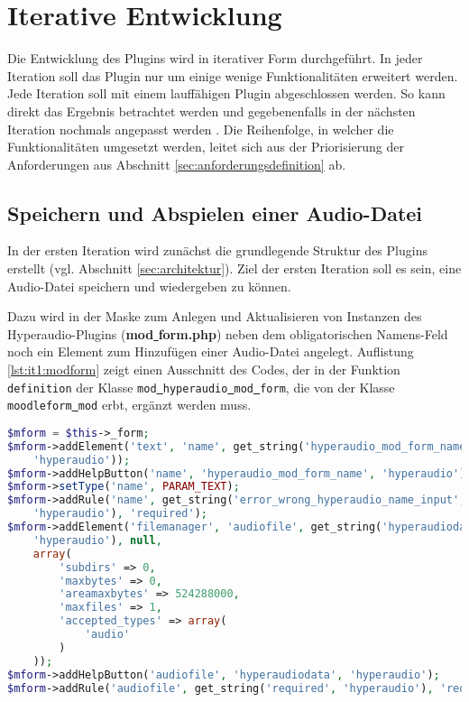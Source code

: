 \section{Iterative Entwicklung}
Die Entwicklung des Plugins wird in iterativer Form durchgeführt. In jeder Iteration soll das Plugin nur um einige wenige Funktionalitäten erweitert werden. Jede Iteration soll mit einem lauffähigen Plugin abgeschlossen werden. So kann direkt das Ergebnis betrachtet werden und gegebenenfalls in der nächsten Iteration nochmals angepasst werden \citep{augsten2018iterativ}. Die Reihenfolge, in welcher die Funktionalitäten umgesetzt werden, leitet sich aus der Priorisierung der Anforderungen aus Abschnitt \ref{sec:anforderungsdefinition} ab.

\subsection{Speichern und Abspielen einer Audio-Datei}
\label{sec:it1}
In der ersten Iteration wird zunächst die grundlegende Struktur des Plugins erstellt (vgl. Abschnitt \ref{sec:architektur}). Ziel der ersten Iteration soll es sein, eine Audio-Datei speichern und wiedergeben zu können.

Dazu wird in der Maske zum Anlegen und Aktualisieren von Instanzen des Hyperaudio-Plugins (\textbf{mod\underline{{ }}form.php}) neben dem obligatorischen Namens-Feld noch ein Element zum Hinzufügen einer Audio-Datei angelegt. Auflistung \ref{lst:it1:modform} zeigt einen Ausschnitt des Codes, der in der Funktion \texttt{definition} der Klasse \texttt{mod\underline{{ }}hyperaudio\underline{{ }}mod\underline{{ }}form}, die von der Klasse \texttt{moodleform\underline{{ }}mod} erbt, ergänzt werden muss. 

\begin{lstlisting}[language=php,
             linewidth=\textwidth,
             caption={Ausschnitt der \textbf{mod\underline{{ }}form.php} in der 1. Iteration},
             label={lst:it1:modform}]
$mform = $this->_form;
$mform->addElement('text', 'name', get_string('hyperaudio_mod_form_name',
    'hyperaudio'));
$mform->addHelpButton('name', 'hyperaudio_mod_form_name', 'hyperaudio');
$mform->setType('name', PARAM_TEXT);
$mform->addRule('name', get_string('error_wrong_hyperaudio_name_input',
    'hyperaudio'), 'required');
$mform->addElement('filemanager', 'audiofile', get_string('hyperaudiodata',
    'hyperaudio'), null,
    array(
        'subdirs' => 0,
        'maxbytes' => 0,
        'areamaxbytes' => 524288000,
        'maxfiles' => 1,
        'accepted_types' => array(
            'audio'
        )
    ));
$mform->addHelpButton('audiofile', 'hyperaudiodata', 'hyperaudio');
$mform->addRule('audiofile', get_string('required', 'hyperaudio'), 'required');
\end{lstlisting}


